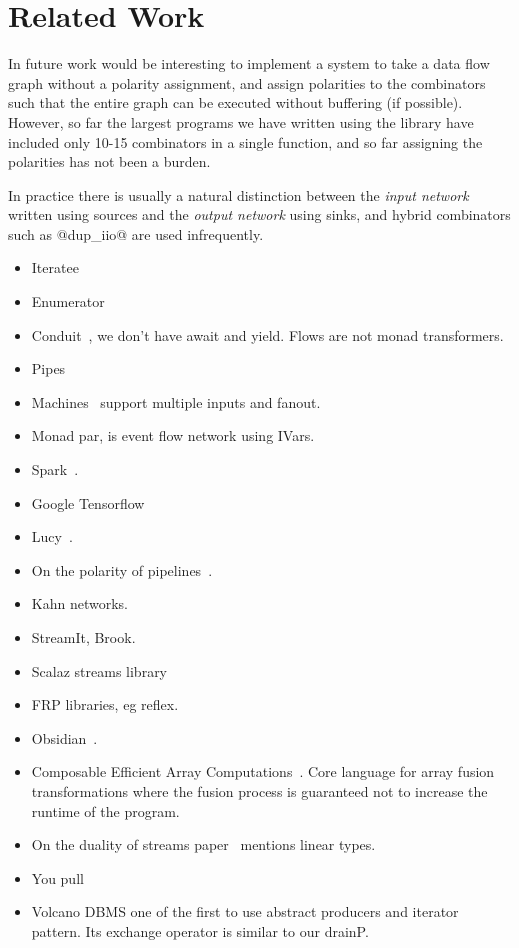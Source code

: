 \section{Related Work}

In future work would be interesting to implement a system to take a data flow graph without a polarity assignment, and assign polarities to the combinators such that the entire graph can be executed without buffering (if possible). However, so far the largest programs we have written using the library have included only 10-15 combinators in a single function, and so far assigning the polarities has not been a burden. 

In practice there is usually a natural distinction between the \emph{input network} written using sources and the \emph{output network} using sinks, and hybrid combinators such as @dup_iio@ are used infrequently.

\begin{itemize}
\item Iteratee~\cite{Kiselyov:iteratee}
\item Enumerator~\cite{hackage:enumerator}
\item Conduit~\cite{hackage:conduit}, we don't have await and yield. Flows are not monad transformers.
\item Pipes~\cite{hackage:pipes}
\item Machines~\cite{hackage:machines} support multiple inputs and fanout.
\item Monad par, is event flow network using IVars.
\item Spark~\cite{Zaharia:RDDs}.
\item Google Tensorflow
\item Lucy~\cite{Mandel:Lucy}.
\item On the polarity of pipelines~\cite{Kay:YouPull}.
\item Kahn networks.
\item StreamIt, Brook.
\item Scalaz streams library~\cite{github:scalaz-streams}
\item FRP libraries, eg reflex.
\item Obsidian~\cite{Claessen:ExpressiveArray}.
\item Composable Efficient Array Computations~\cite{Bernardy:Composable}. Core language for array fusion transformations where the fusion process is guaranteed not to increase the runtime of the program. 
\item On the duality of streams paper~\cite{Bernardy:Duality} mentions linear types.
\item You pull~\cite{Kay:YouPull}
\item Volcano DBMS one of the first to use abstract producers and iterator pattern. Its exchange operator is similar to our drainP.~\cite{Graefe:Volcano}
\end{itemize}


